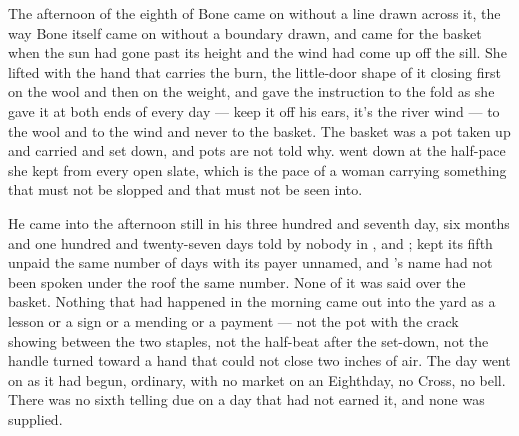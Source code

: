 The afternoon of the eighth of Bone came on without a line drawn across it, the way Bone itself came on without a boundary drawn, and  came for the basket when the sun had gone past its height and the wind had come up off the sill. She lifted with the hand that carries the burn, the little-door shape of it closing first on the wool and then on the weight, and gave the instruction to the fold as she gave it at both ends of every day --- keep it off his ears, it's the river wind --- to the wool and to the wind and never to the basket. The basket was a pot taken up and carried and set down, and pots are not told why.  went down at the half-pace she kept from every open slate, which is the pace of a woman carrying something that must not be slopped and that must not be seen into.

He came into the afternoon still in his three hundred and seventh day, six months and one hundred and twenty-seven days told by nobody in ,  and ;  kept its fifth unpaid the same number of days with its payer unnamed, and 's name had not been spoken under the roof the same number. None of it was said over the basket. Nothing that had happened in the morning came out into the yard as a lesson or a sign or a mending or a payment --- not the pot with the crack showing between the two staples, not the half-beat after the set-down, not the handle turned toward a hand that could not close two inches of air. The day went on as it had begun, ordinary, with no market on an Eighthday, no Cross, no bell. There was no sixth telling due on a day that had not earned it, and none was supplied.

